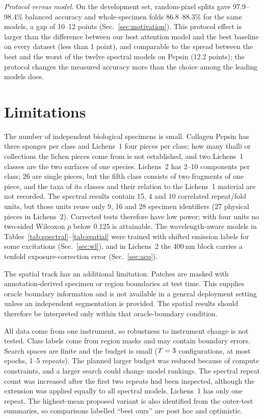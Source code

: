 \documentclass[journal]{IEEEtran}
\begin{document}
\emph{Protocol versus model.} On the development set, random-pixel splits gave 97.9--98.4\% balanced accuracy and whole-specimen folds 86.8--88.3\% for the same models, a gap of 10--12 points (Sec.~\ref{sec:motivation}). This protocol effect is larger than the difference between our best attention model and the best baseline on every dataset (less than 1 point), and comparable to the spread between the best and the worst of the twelve spectral models on Pepsin (12.2 points); the protocol changes the measured accuracy more than the choice among the leading models does.

\section{Limitations}\label{sec:limits}
The number of independent biological specimens is small. Collagen Pepsin has three sponges per class and Lichens~1 four pieces per class; how many thalli or collections the lichen pieces come from is not established, and two Lichens~1 classes are the two surfaces of one species. Lichens~2 has 2--10 components per class; 26 are single pieces, but the fifth class consists of two fragments of one piece, and the taxa of its classes and their relation to the Lichens~1 material are not recorded. The spectral results contain 15, 4 and 10 correlated repeat/fold units, but those units reuse only 9, 16 and 28 specimen identifiers (27 physical pieces in Lichens~2). Corrected tests therefore have low power; with four units no two-sided Wilcoxon $p$ below 0.125 is attainable. The wavelength-aware models in Tables~\ref{tab:spectral}--\ref{tab:spatial} were trained with shifted emission labels for some excitations (Sec.~\ref{sec:wl}), and in Lichens~2 the 400\,nm block carries a tenfold exposure-correction error (Sec.~\ref{sec:acq}).

The spatial track has an additional limitation. Patches are masked with annotation-derived specimen or region boundaries at test time. This supplies oracle boundary information and is not available in a general deployment setting unless an independent segmentation is provided. The spatial results should therefore be interpreted only within that oracle-boundary condition.

All data come from one instrument, so robustness to instrument change is not tested. Class labels come from region masks and may contain boundary errors. Search spaces are finite and the budget is small ($T=3$ configurations, at most \MaxEpochsE{} epochs, 1--5 repeats). The planned larger budget was reduced because of compute constraints, and a larger search could change model rankings. The spectral repeat count was increased after the first two repeats had been inspected, although the extension was applied equally to all spectral models. Lichens~1 has only one repeat. The highest-mean proposed variant is also identified from the outer-test summaries, so comparisons labelled ``best ours'' are post hoc and optimistic.
\end{document}
